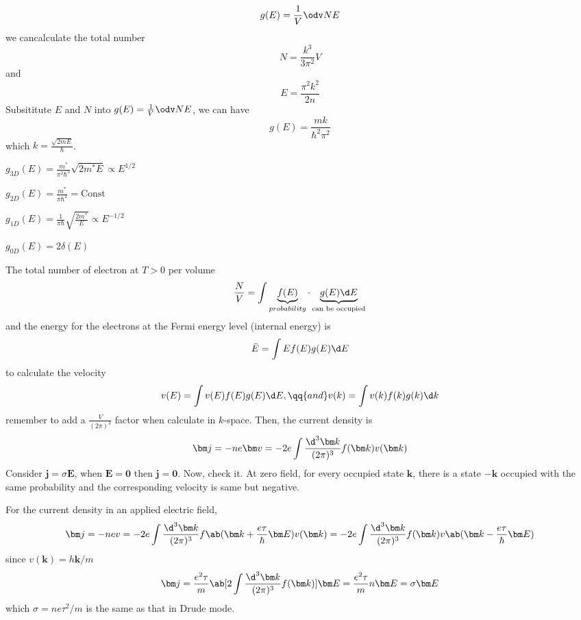 \begin{equation}
  g(E) = \frac1V \odv NE
\end{equation}
we cancalculate the total number
\begin{equation}
  N = \frac{k^3}{3\pi^2}V
\end{equation}
and
\begin{equation}
  E = \frac{\pi^2 k^2}{2n}
\end{equation}
Subsititute $E$ and $N$ into $g(E) = \frac1V\odv NE$, we can have
\begin{equation}
  g(E) = \frac{mk}{\hbar^2 \pi^2}
\end{equation}
which $k = \frac{\sqrt{2mE}}\hbar$.
\begin{enumext}[columns = 2]
  \item $g_{3D}(E) = \frac{m^*}{\pi^2 \hbar^3} \sqrt{2m^*E} \propto E^{1/2}$
  \item $g_{2D}(E) = \frac{m^*}{\pi \hbar^2} = \text{Const}$
  \item $g_{1D}(E) = \frac1{\pi \hbar} \sqrt{\frac{2m^*}{E}} \propto E^{-1/2}$
  \item $g_{0D}(E) = 2\delta(E)$
\end{enumext}
The total number of electron at $T > 0$ per volume
\[
  \frac NV = \int \underbrace{f(E)}_{probability} \cdot \underbrace{g(E) \d E}_{\text{can be occupied}}
\]
and the energy for the electrons at the Fermi energy level (internal energy) is
\begin{equation}
  \bar E = \int E f(E) g(E) \d E
\end{equation}
to calculate the velocity
\[
  v(E) = \int v(E) f(E) g(E) \d E, \qq{and}
  v(k) = \int v(k) f(k) g(k) \d k
\]
remember to add a $\frac{V}{(2\pi)^3}$ factor when calculate in $k$-space.
Then, the current density is
\begin{equation}
  \bm j = -ne\bm v = -2e \int \frac{\d^3 \bm k}{(2\pi)^3} f(\bm k) v(\bm k)
\end{equation}
Consider $\bm j = \sigma \bm E$,
when $\bm E = \bm 0$ then $\bm j = \bm 0$. Now, check it.
At zero field, for every occupied state $\bm k$, there is a state $-\bm k$ occupied with the same probability and the corresponding velocity is same but negative.

For the current density in an applied electric field,
\begin{equation}
  \bm j = -nev = -2e \int \frac{\d^3 \bm k}{(2\pi)^3} f\ab(\bm k + \frac{e\tau}{\hbar} \bm E) v(\bm k)
  = -2e \int \frac{\d^3 \bm k}{(2\pi)^3} f(\bm k) v\ab(\bm k - \frac{e\tau}{\hbar} \bm E)
\end{equation}
since $v(\bm k) = h\bm k/m$
\[
  \bm j = \frac{e^2\tau}{m} \ab[2\int \frac{\d^3\bm k}{(2\pi)^3} f(\bm k)] \bm E
= \frac{e^2\tau}{m} n \bm E = \sigma \bm E
\]
which $\sigma = ne\tau^2/m$ is the same as that in Drude mode.


